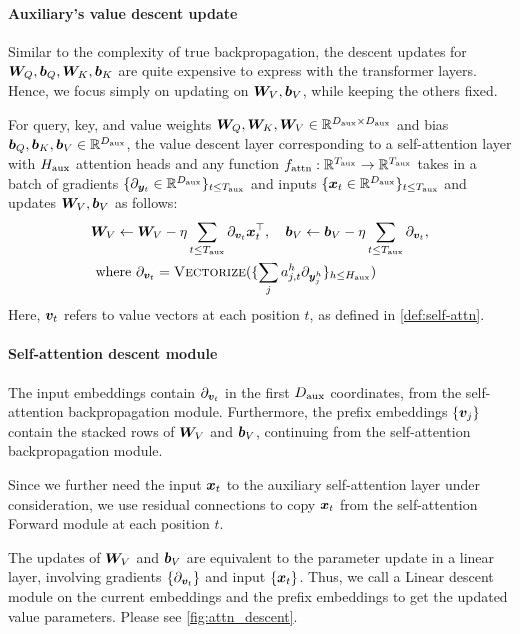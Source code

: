 \paragraph{Auxiliary's value descent update} Similar to the complexity of true backpropagation, the descent updates for ${\bm{W}}_Q, {\bm{b}}_Q, {\bm{W}}_K, {\bm{b}}_K$ are quite expensive to express with the transformer layers. Hence, we focus simply on updating on ${\bm{W}}_V, {\bm{b}}_V$, while keeping the others fixed. 


\begin{definition}\label{def:self-attn-value-update}
For query, key, and value weights ${\bm{W}}_Q, {\bm{W}}_K, {\bm{W}}_V \in\mathbb{R}^{D_{\text{aux}}\times D_{\text{aux}}}$ and bias ${\bm{b}}_{Q}, {\bm{b}}_{K}, {\bm{b}}_{V} \in\mathbb{R}^{D_{\text{aux}}}$, the value descent layer corresponding to a self-attention layer with $H_{\text{aux}}$ attention heads and any function $f_{\mathrm{attn}}: \mathbb{R}^{T_{\text{aux}}} \to \mathbb{R}^{T_{\text{aux}}}$ takes in a batch of gradients $\{ \partial_{ {\bm{y}}_t } \in\mathbb{R}^{D_{\text{aux}}} \}_{t \le T_{\text{aux}}}$ and inputs $ \{  {\bm{x}}_t  \in\mathbb{R}^{D_{\text{aux}}} \}_{t \le T_{\text{aux}} } $ and updates ${\bm{W}}_V, {\bm{b}}_V$ as follows:
\begin{align*}
&{\bm{W}}_V \gets {\bm{W}}_V - \eta \sum_{t \le T_{\text{aux}} } \partial_{ {\bm{v}}_t } {\bm{x}}_t^{\top}, \quad {\bm{b}}_V \gets {\bm{b}}_V - \eta \sum_{t \le T_{\text{aux}} } \partial_{ {\bm{v}}_t }, \\& \text{ where } \partial_{ {\bm{v}}_t } = \textsc{Vectorize}(\{ \sum_{j} a^h_{j, t}  \partial_{{\bm{y}}^h_j} \}_{h \le H_{\text{aux}} } ) 
\end{align*} 
Here, ${\bm{v}}_t$ refers to value vectors at each position $t$, as defined in \cref{def:self-attn}. 
\end{definition}


\paragraph{\simulator{} Self-attention descent module} 
The input embeddings contain $\partial_{{\bm{v}}_t}$ in the first $D_{\text{aux}}$ coordinates, from the \simulator{} self-attention backpropagation module. Furthermore, the prefix embeddings $\{ {\bm{v}}_j \}$ contain the stacked rows of ${\bm{W}}_V$ and ${\bm{b}}_V$, continuing from the \simulator{} self-attention backpropagation module.

Since we further need the input ${\bm{x}}_t$ to the auxiliary self-attention layer under consideration, we use residual connections to copy ${\bm{x}}_t$ from the \simulator{} self-attention Forward module at each position $t$. 


The updates of ${\bm{W}}_V$ and ${\bm{b}}_V$ are equivalent to the parameter update in a linear layer, involving gradients $\{ \partial_{{\bm{v}}_t} \}$ and input $\{ {\bm{x}}_t \}$. Thus, we call a Linear descent module on the current embeddings and the prefix embeddings to get the updated value parameters. Please see \cref{fig:attn_descent}.



